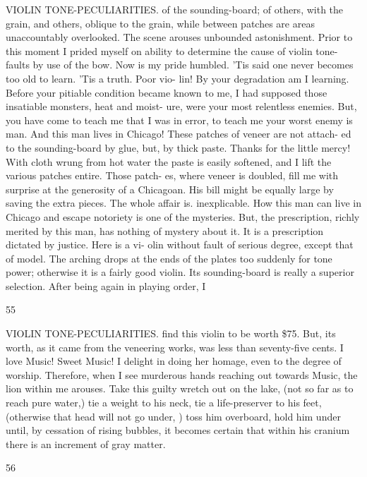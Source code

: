 \documentclass{article}
\begin{document}
VIOLIN TONE-PECULIARITIES. of the sounding-board; of others, with the grain, and others, oblique to the grain, while between patches are areas unaccountably overlooked. The scene arouses unbounded astonishment. Prior to this moment I prided myself on ability to determine the cause of violin tone-faults by use of the bow. Now is my pride humbled. 'Tis said one never becomes too old to learn. 'Tis a truth. Poor vio- lin! By your degradation am I learning. Before your pitiable condition became known to me, I had supposed those insatiable monsters, heat and moist- ure, were your most relentless enemies. But, you have come to teach me that I was in error, to teach me your worst enemy is man. And this man lives in Chicago! These patches of veneer are not attach- ed to the sounding-board by glue, but, by thick paste. Thanks for the little mercy! With cloth wrung from hot water the paste is easily softened, and I lift the various patches entire. Those patch- es, where veneer is doubled, fill me with surprise at the generosity of a Chicagoan. His bill might be equally large by saving the extra pieces. The whole affair is. inexplicable. How this man can live in Chicago and escape notoriety is one of the mysteries. But, the prescription, richly merited by this man, has nothing of mystery about it. It is a prescription dictated by justice. Here is a vi- olin without fault of serious degree, except that of model. The arching drops at the ends of the plates too suddenly for tone power; otherwise it is a fairly good violin. Its sounding-board is really a superior selection. After being again in playing order, I

55

VIOLIN TONE-PECULIARITIES. find this violin to be worth \$75. But, its worth, as it came from the veneering works, was less than seventy-five cents. I love Music! Sweet Music! I delight in doing her homage, even to the degree of worship. Therefore, when I see murderous hands reaching out towards Music, the lion within me arouses. Take this guilty wretch out on the lake, (not so far as to reach pure water,) tie a weight to his neck, tie a life-preserver to his feet, (otherwise that head will not go under, ) toss him overboard, hold him under until, by cessation of rising bubbles, it becomes certain that within his cranium there is an increment of gray matter.

56
\end{document}

